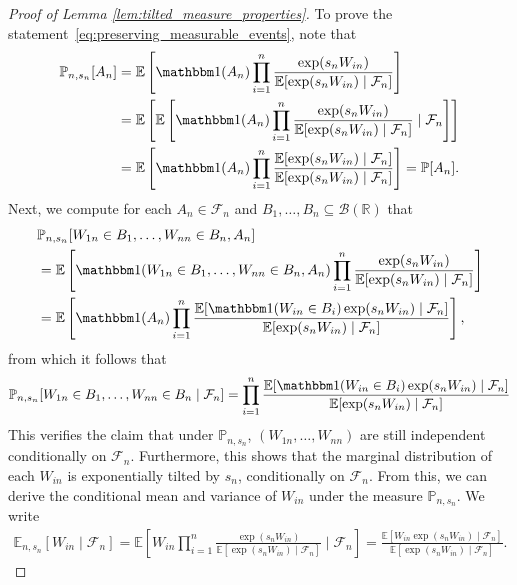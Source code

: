 \documentclass[12pt]{article}
\theoremstyle{definition}
\def\P{\mathbb{P}}
\def\P{\mathbb{P}}
\newcommand{\E}{\mathbb E}								%
\renewcommand{\P}{\mathbb{P}}							%
\newcommand{\R}{\mathbb{R}}								%
\newcommand{\indicator}{\mathbbm 1}						%
\begin{document}
\begin{proof}[Proof of Lemma \ref{lem:tilted_measure_properties}]

To prove the statement~\eqref{eq:preserving_measurable_events}, note that
\begin{equation*}
\begin{split}
	\P_{n, s_n}[A_n] &= \E\left[\indicator(A_n)\prod_{i = 1}^n \frac{\exp(s_n W_{in})}{\E[\exp(s_n W_{in}) \mid \mathcal F_n]}\right] \\
	&= \E\left[\E\left[\indicator(A_n)\prod_{i = 1}^n \frac{\exp(s_n W_{in})}{\E[\exp(s_n W_{in}) \mid \mathcal F_n]} \mid \mathcal F_n \right]\right]  \\
	&= \E\left[\indicator(A_n)\prod_{i = 1}^n \frac{\E[\exp(s_n W_{in}) \mid \mathcal F_n]}{\E[\exp(s_n W_{in}) \mid \mathcal F_n]}\right] = \P[A_n].
\end{split}
\end{equation*}
Next, we compute for each $A_n \in \mathcal F_n$ and $B_1, \dots, B_n \subseteq \mathcal B(\R)$ that
\begin{equation}
\begin{split}
&\P_{n, s_n}[W_{1n} \in B_1, \dots, W_{nn} \in B_n, A_n] \\
&= \E\left[\indicator(W_{1n} \in B_1, \dots, W_{nn} \in B_n, A_n)\prod_{i = 1}^n \frac{\exp(s_n W_{in})}{\E[\exp(s_n W_{in}) \mid \mathcal F_n]}\right] \\
&= \E\left[\indicator(A_n)\prod_{i = 1}^n \frac{\E[\indicator(W_{in} \in B_i)\exp(s_n W_{in}) \mid \mathcal F_n]}{\E[\exp(s_n W_{in}) \mid \mathcal F_n]}\right],
\end{split}
\label{eq:conditional_tilting}
\end{equation}
from which it follows that
\begin{equation*}
\P_{n, s_n}[W_{1n} \in B_1, \dots, W_{nn} \in B_n \mid \mathcal F_n] = \prod_{i = 1}^n \frac{\E[\indicator(W_{in} \in B_i)\exp(s_n W_{in}) \mid \mathcal F_n]}{\E[\exp(s_n W_{in}) \mid \mathcal F_n]}
\end{equation*}
This verifies the claim that under $\P_{n, s_n}$, $(W_{1n}, \dots, W_{nn})$ are still independent conditionally on $\mathcal F_n$. Furthermore, this shows that the marginal distribution of each $W_{in}$ is exponentially tilted by $s_n$, conditionally on $\mathcal F_n$. From this, we can derive the conditional mean and variance of $W_{in}$ under the measure $\P_{n,s_n}$. We write 
\begin{align*}
	\E_{n,s_n}[W_{in}\mid \mathcal{F}_n]=\E\left[W_{in}\prod_{i = 1}^n \frac{\exp(s_n W_{in})}{\E[\exp(s_n W_{in}) \mid \mathcal F_n]}\mid \mathcal{F}_n\right]=\frac{\E\left[W_{in}\exp(s_nW_{in})\mid \mathcal{F}_n\right]}{\E[\exp(s_n W_{in}) \mid \mathcal F_n]}.

\end{align*}
\end{proof}
\end{document}
